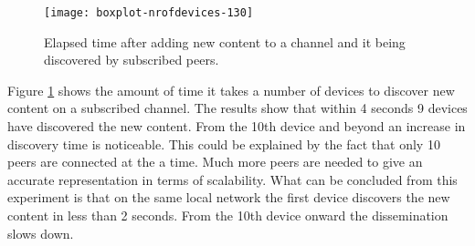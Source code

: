 \begin{figure}[H]
	\centering %
	\texttt{[image: boxplot-nrofdevices-130]}
	\caption{Elapsed time after adding new content to a channel and it being discovered by subscribed peers.}
	\label{fig:boxplot-nr.of.devices-130}
\end{figure}
Figure \ref{fig:boxplot-nr.of.devices-130} shows the amount of time it takes a number of devices to discover new content on a subscribed channel.
The results show that within 4 seconds 9 devices have discovered the new content.
From the 10th device and beyond an increase in discovery time is noticeable.
This could be explained by the fact that only 10 peers are connected at the a time.
Much more peers are needed to give an accurate representation in terms of scalability.
What can be concluded from this experiment is that on the same local network the first device discovers the new content in less than 2 seconds.
From the 10th device onward the dissemination slows down.


